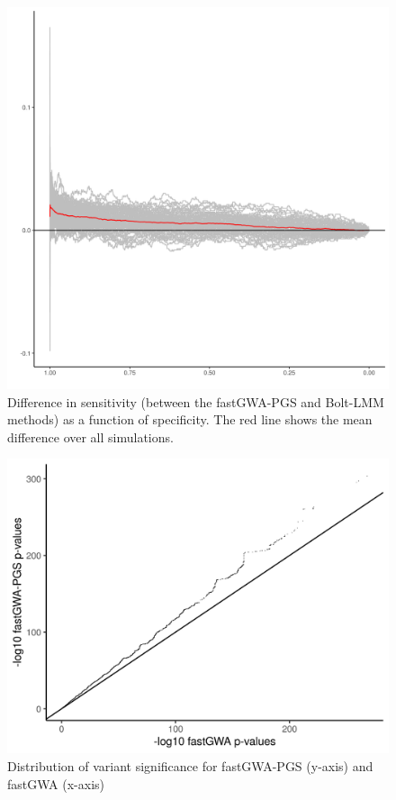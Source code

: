 \documentclass{article}
\begin{document}
\begin{figure}[h!]
  \includegraphics[width=\textwidth]{images/suppFig1.png}
  \caption{Difference in sensitivity (between the fastGWA-PGS and Bolt-LMM methods) as a function of specificity. The red line shows the mean difference over all simulations.}
\end{figure}

\begin{figure}[h!]
  \includegraphics[width=\textwidth]{images/suppFig2.png}
  \caption{Distribution of variant significance for fastGWA-PGS (y-axis) and fastGWA (x-axis)}
\end{figure}
\end{document}
